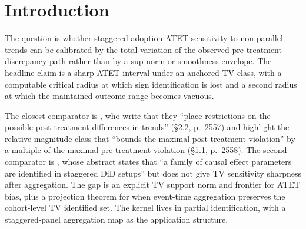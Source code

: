 \documentclass[11pt]{article}
\theoremstyle{definition}
\theoremstyle{plain}
\theoremstyle{remark}
\begin{document}
\begin{abstract}
This proposal asks for sharp partial identification of a staggered-adoption ATET when the untreated post-treatment trend discrepancy is restricted by a total-variation budget calibrated to the observed pre-treatment discrepancy path. The routine part is a support-function representation of the ATET interval under an anchored TV class, together with deterministic sign-loss and vacuity frontiers defined by the same support. The flagship claim is that this support admits a closed form through a computable TV dual norm of the staggered aggregation weights, and that the resulting interval can be strictly tighter than the Rambachan--Roth relative-magnitude interval because TV uses the ordering and cancellation structure of the bias weights rather than only their maximal magnitude. A second conjecture asks when that aggregate-path TV interval is itself sharp for staggered adoption, rather than a conservative or anti-conservative projection of a cohort-level TV class. If resolved, the result would turn pretrend sensitivity reporting from a generic robustness scalar into an evaluable frontier with an explicit design diagnostic.
\end{abstract}

\section{Introduction}
The question is whether staggered-adoption ATET sensitivity to non-parallel trends can be calibrated by the total variation of the observed pre-treatment discrepancy path rather than by a sup-norm or smoothness envelope. The headline claim is a sharp ATET interval under an anchored TV class, with a computable critical radius at which sign identification is lost and a second radius at which the maintained outcome range becomes vacuous.

The closest comparator is \citet{RambachanRoth2023CrediblePT}, who write that they ``place restrictions on the possible post-treatment differences in trends'' (\S2.2, p.~2557) and highlight the relative-magnitude class that ``bounds the maximal post-treatment violation'' by a multiple of the maximal pre-treatment violation (\S1.1, p.~2558). The second comparator is \citet{CallawaySantAnna2021MultiplePeriods}, whose abstract states that ``a family of causal effect parameters are identified in staggered DiD setups'' but does not give TV sensitivity sharpness after aggregation. The gap is an explicit TV support norm and frontier for ATET bias, plus a projection theorem for when event-time aggregation preserves the cohort-level TV identified set. The kernel lives in partial identification, with a staggered-panel aggregation map as the application structure.
\end{document}
